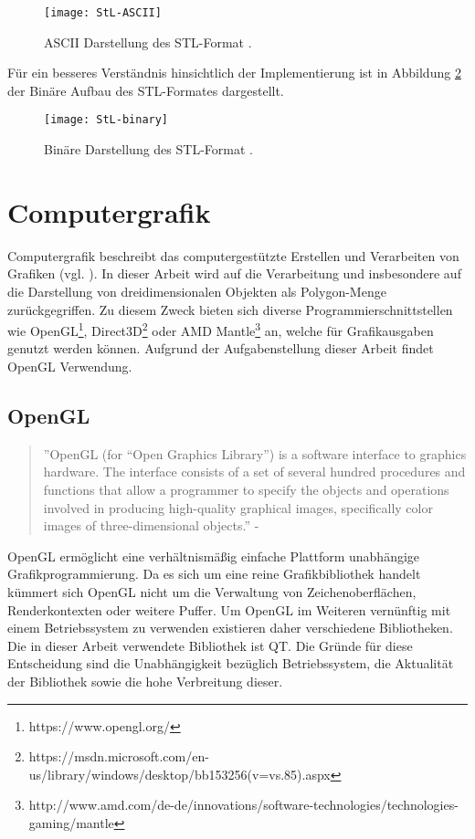 \begin{figure}[H]
	\centering
	\texttt{[image: StL-ASCII]}
	\caption{ASCII Darstellung des STL-Format \citep{STLFormat}.}
	\label{fig:ASCIISTL}
\end{figure}
\noindent Für ein besseres Verständnis hinsichtlich der Implementierung ist in Abbildung \ref{fig:BINARYSTL} der Binäre Aufbau des STL-Formates dargestellt. 
\begin{figure}
	\centering
	\texttt{[image: StL-binary]}
	\caption{Binäre Darstellung des STL-Format \citep{STLFormat}.}
	\label{fig:BINARYSTL}
\end{figure}

\section{Computergrafik}
Computergrafik beschreibt das computergestützte Erstellen und Verarbeiten von Grafiken (vgl. \citep{ComputerGraphics}). In dieser Arbeit wird auf die Verarbeitung und insbesondere auf die Darstellung von dreidimensionalen Objekten als Polygon-Menge zurückgegriffen. Zu diesem Zweck bieten sich diverse Programmierschnittstellen wie OpenGL\footnote{https://www.opengl.org/}, Direct3D\footnote{https://msdn.microsoft.com/en-us/library/windows/desktop/bb153256(v=vs.85).aspx} oder AMD Mantle\footnote{http://www.amd.com/de-de/innovations/software-technologies/technologies-gaming/mantle} an, welche für Grafikausgaben genutzt werden können. Aufgrund der Aufgabenstellung dieser Arbeit findet OpenGL Verwendung.
\subsection{OpenGL}
\begin{quote}
	''OpenGL (for “Open Graphics Library”) is a software interface to graphics hardware.
	The interface consists of a set of several hundred procedures and functions
	that allow a programmer to specify the objects and operations involved in producing
	high-quality graphical images, specifically color images of three-dimensional
	objects.'' - \citep{OpenGLDoku}
\end{quote}
OpenGL ermöglicht eine verhältnismäßig einfache Plattform unabhängige Grafikprogrammierung. Da es sich um eine reine Grafikbibliothek handelt kümmert sich OpenGL nicht um die Verwaltung von Zeichenoberflächen, Renderkontexten oder weitere Puffer. Um OpenGL im Weiteren vernünftig mit einem Betriebssystem zu verwenden existieren daher verschiedene Bibliotheken. Die in dieser Arbeit verwendete Bibliothek ist QT. Die Gründe für diese Entscheidung sind die Unabhängigkeit bezüglich Betriebssystem, die Aktualität der Bibliothek sowie die hohe Verbreitung dieser.